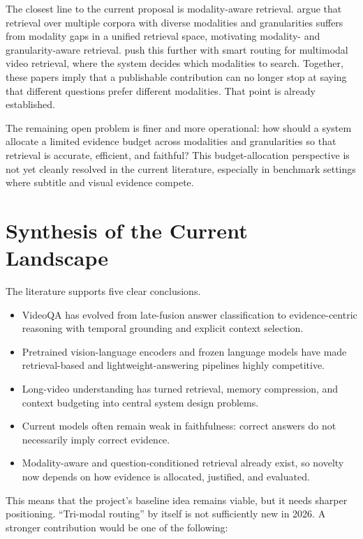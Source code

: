 \documentclass{article}
\begin{document}
The closest line to the current proposal is modality-aware retrieval.
\citet{yeo2025universalrag} argue that retrieval over multiple corpora with diverse modalities and granularities suffers from modality gaps in a unified retrieval space, motivating modality- and granularity-aware retrieval.
\citet{delarosa2025modaroute} push this further with smart routing for multimodal video retrieval, where the system decides which modalities to search.
Together, these papers imply that a publishable contribution can no longer stop at saying that different questions prefer different modalities.
That point is already established.

The remaining open problem is finer and more operational: how should a system allocate a limited evidence budget across modalities and granularities so that retrieval is accurate, efficient, and faithful?
This budget-allocation perspective is not yet cleanly resolved in the current literature, especially in benchmark settings where subtitle and visual evidence compete.

\section{Synthesis of the Current Landscape}
The literature supports five clear conclusions.

\begin{itemize}
  \item VideoQA has evolved from late-fusion answer classification to evidence-centric reasoning with temporal grounding and explicit context selection.
  \item Pretrained vision-language encoders and frozen language models have made retrieval-based and lightweight-answering pipelines highly competitive.
  \item Long-video understanding has turned retrieval, memory compression, and context budgeting into central system design problems.
  \item Current models often remain weak in faithfulness: correct answers do not necessarily imply correct evidence.
  \item Modality-aware and question-conditioned retrieval already exist, so novelty now depends on how evidence is allocated, justified, and evaluated.
\end{itemize}

This means that the project's baseline idea remains viable, but it needs sharper positioning.
``Tri-modal routing'' by itself is not sufficiently new in 2026.
A stronger contribution would be one of the following:
\end{document}
